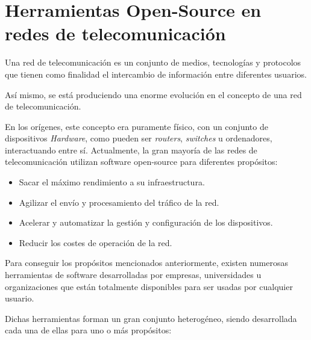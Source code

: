 \section{Herramientas Open-Source en redes de telecomunicación}
\label{sec:opensourcenets}

Una red de telecomunicación es un conjunto de medios, tecnologías y protocolos que tienen como finalidad el intercambio de información entre diferentes usuarios.

Así mismo, se está produciendo una enorme evolución en el concepto de una red de telecomunicación. 

En los orígenes, este concepto era puramente físico, con un conjunto de dispositivos \textit{Hardware}, como pueden ser \textit{routers}, \textit{switches} u ordenadores, interactuando entre sí. Actualmente, la gran mayoría de las redes de telecomunicación utilizan software open-source para diferentes propósitos:

\begin{itemize}
	\item Sacar el máximo rendimiento a su infraestructura.
	\item Agilizar el envío y procesamiento del tráfico de la red.
	\item Acelerar y automatizar la gestión y configuración de los dispositivos.
	\item Reducir los costes de operación de la red.
\end{itemize}

Para conseguir los propósitos mencionados anteriormente, existen numerosas herramientas de software desarrolladas por empresas, universidades u organizaciones que están totalmente disponibles para ser usadas por cualquier usuario.

Dichas herramientas forman un gran conjunto heterogéneo, siendo desarrollada cada una de ellas para uno o más propósitos:

